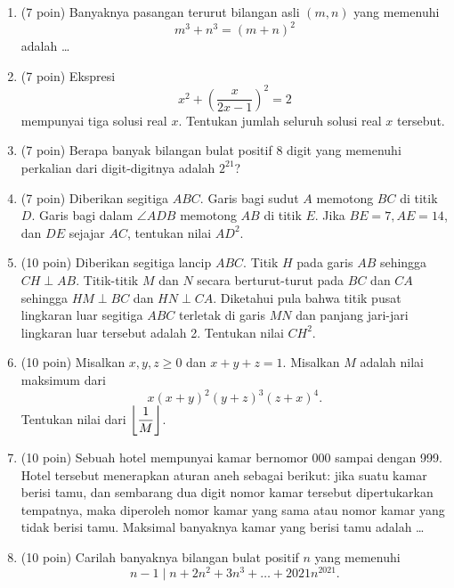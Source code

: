 \documentclass[12pt]{scrartcl}
\begin{document}
\begin{enumerate}
	    \item (7 poin) Banyaknya pasangan terurut bilangan asli $(m,n)$ yang memenuhi $$m^3+n^3=(m+n)^2$$ adalah \dots
	    
	    \item (7 poin) Ekspresi $$x^2+\left(\dfrac{x}{2x-1}\right)^2=2$$ mempunyai tiga solusi real $x$. Tentukan jumlah seluruh solusi real $x$ tersebut.
	    
	    \item (7 poin) Berapa banyak bilangan bulat positif 8 digit yang memenuhi perkalian dari digit-digitnya adalah $2^{21}$?
	    
	    \item (7 poin) Diberikan segitiga $ABC$. Garis bagi sudut $A$ memotong $BC$ di titik $D$. Garis bagi dalam $\angle ADB$ memotong $AB$ di titik $E$. Jika $BE = 7, AE = 14$, dan $DE$ sejajar $AC$, tentukan nilai $AD^2$.
	    
	    \item (10 poin) Diberikan segitiga lancip $ABC$. Titik $H$ pada garis $AB$ sehingga $CH \perp AB$. Titik-titik $M$ dan $N$ secara berturut-turut pada $BC$ dan $CA$ sehingga $HM \perp BC$ dan $HN \perp CA$. Diketahui pula bahwa titik pusat lingkaran luar segitiga $ABC$ terletak di garis $MN$ dan panjang jari-jari lingkaran luar tersebut adalah 2. Tentukan nilai $CH^2$.
	
	    \item (10 poin) Misalkan $x,y,z \ge 0$ dan $x+y+z=1$. Misalkan $M$ adalah nilai maksimum dari
	    $$x(x+y)^2(y+z)^3(z+x)^4.$$
	    Tentukan nilai dari $\left\lfloor \dfrac{1}{M} \right\rfloor$.
	    
	    \item (10 poin) Sebuah hotel mempunyai kamar bernomor 000 sampai dengan 999. Hotel tersebut menerapkan aturan aneh sebagai berikut: jika suatu kamar berisi tamu, dan sembarang dua digit nomor kamar tersebut dipertukarkan tempatnya, maka diperoleh nomor kamar yang sama atau nomor kamar yang tidak berisi tamu. Maksimal banyaknya kamar yang berisi tamu adalah \dots
	    
	    \item (10 poin) Carilah banyaknya bilangan bulat positif $n$ yang memenuhi 
	    $$n-1 \mid n+2n^2+3n^3+\dots+2021n^{2021}.$$
	\end{enumerate}
	
\end{document}
